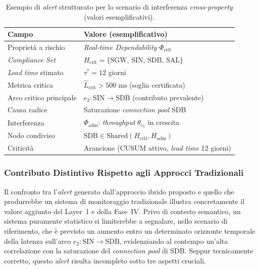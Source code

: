 \begin{table}[htbp]
\centering
\caption{Esempio di \textit{alert} strutturato per lo scenario di interferenza \textit{cross-property}
(valori esemplificativi).}
\label{tab:alert_telemed}
\begin{tabular}{ll}
\toprule
\textbf{Campo} & \textbf{Valore (esemplificativo)} \\
\midrule
Proprietà a rischio       & \textit{Real-time Dependability} $\Phi_{\text{crit}}$ \\
\textit{Compliance Set}   & $H_{\text{crit}} = \{\text{SGW, SIN, SDB, SAL}\}$ \\
\textit{Lead time} stimato & $\tau^* = 12$ giorni \\
Metrica critica           & $\hat{L}_{\text{crit}} > 500\;\text{ms}$ (soglia certificata) \\
Arco critico principale   & $e_2 : \text{SIN} \to \text{SDB}$ (contributo prevalente) \\
Causa radice              & Saturazione \textit{connection pool} SDB \\
Interferenza              & $\Phi_{\text{adm}}$: \textit{throughput} $\theta_{e_5}$ in crescita \\
Nodo condiviso            & $\text{SDB} \in \text{Shared}(H_{\text{crit}}, H_{\text{adm}})$ \\
Criticità                 & Arancione (\gls{CUSUM} attivo, \textit{lead time} 12 giorni) \\
\bottomrule
\end{tabular}
\end{table}

\subsubsection{Contributo Distintivo Rispetto agli Approcci Tradizionali}
\label{sec:contributo_distintivo}

Il confronto tra l'\textit{alert} generato dall'approccio ibrido proposto e quello che produrrebbe
un sistema di monitoraggio tradizionale illustra concretamente il valore aggiunto del Layer~1 e
della Fase~IV. Privo di contesto semantico, un sistema puramente statistico si limiterebbe a
segnalare, nello scenario di riferimento, che è previsto un aumento entro un determinato orizzonte
temporale della latenza sull'arco $e_2\!:\!\text{SIN}\!\to\!\text{SDB}$, evidenziando al contempo
un'alta correlazione con la saturazione del \textit{connection pool} di SDB. Seppur tecnicamente
corretto, questo \textit{alert} risulta incompleto sotto tre aspetti cruciali.

